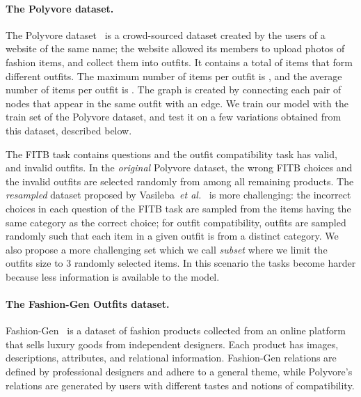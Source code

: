 \documentclass[10pt,twocolumn,letterpaper]{article}
\begin{document}
\paragraph{The Polyvore dataset.}
\label{sssec:poly}
The Polyvore dataset~\cite{han2017learning} is a crowd-sourced dataset created by the users of a website of the same name; the website allowed its members to upload photos of fashion items, and collect them into outfits. It contains a total of  items that form  different outfits. The maximum number of items per outfit is , and the average number of items per outfit is . The graph is created by connecting each pair of nodes that appear in the same outfit with an edge. We train our model with the train set of the Polyvore dataset, and test it on a few variations obtained from this dataset, described below. 









The FITB task contains  questions and the outfit compatibility task has  valid, and  invalid outfits. In the \emph{original} Polyvore dataset, the wrong FITB choices and the invalid outfits are selected randomly from among all remaining products. 
The \emph{resampled} dataset proposed by Vasileba~\emph{et al.}~\cite{vasileva2018learning} is more challenging: the incorrect choices in each question of the FITB task are sampled from the items having the same category as the correct choice; for outfit compatibility, outfits are sampled randomly such that each item in a given outfit is from a distinct category. 
We also propose a more challenging set which we call \emph{subset} where we limit the outfits size to 3 randomly selected items. In this scenario the tasks become harder because less information is available to the model.







\paragraph{The Fashion-Gen Outfits dataset.}
\label{sssec:fgen}
Fashion-Gen~\cite{rostamzadeh2018fashion} is a dataset of fashion products collected from an online platform that sells luxury goods from independent designers. Each product has images, descriptions, attributes, and relational information. 
Fashion-Gen relations are defined by professional designers and adhere to a general theme, while Polyvore's relations are generated by users with different tastes and notions of compatibility.
\end{document}

